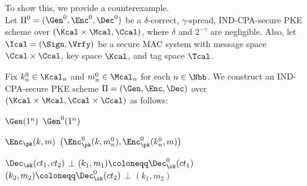 \begin{answer}
    To show this, we provide a counterexample.\\
    Let $\Pi^0=(\Gen^0, \Enc^0, \Dec^0)$ be a $\delta$-correct, $\gamma$-spread, IND-CPA-secure PKE scheme over $(\Kcal\times \Mcal, \Ccal)$, where $\delta$ and $2^{-\gamma}$ are negligible. Also, let  $\Ical=(\Sign, \Vrfy)$ be a secure MAC system with message space $\Ccal \times \Ccal$, key space $\Kcal$, and tag space $\Tcal$.

    Fix $k_n^0\in\Kcal_n$ and $m_n^0\in\Mcal_n$ for each $n\in\Nbb$. We construct an IND-CPA-secure PKE scheme $\Pi=(\Gen, \Enc, \Dec)$ over $(\Kcal\times \Mcal, \Ccal\times \Ccal)$ as follows:
    \begin{simplebox}
        \small
        \noindent
        \begin{minipage}[t]{0.27\textwidth}
            \begin{algorithmic}[1]
                \Statex \textbf{$\Gen(1^n)$}
                \Indent
                \State \Return $\Gen^0(1^n)$
                \EndIndent
            \end{algorithmic}
        \end{minipage}
        \hfill
        \begin{minipage}[t]{0.30\textwidth}
            \begin{algorithmic}[1]
                \Statex \textbf{$\Enc_\pk(k ,m)$}
                \Indent
                    \State \Return $\left(\Enc^0_\pk(k,m_n^0), \Enc^0_\pk(k_n^0 ,m)\right)$
                \EndIndent
            \end{algorithmic}
        \end{minipage}
        \hfill
        \begin{minipage}[t]{0.40\textwidth}
            \begin{algorithmic}[1]
                \Statex \textbf{$\Dec_\sk(ct_1, ct_2)$}
                \Indent
                        \State \Return $\bot$
                    \EndIf
                    \State $(k_1, m_1)\coloneqq \Dec^0_\sk(ct_1)$
                    \State $(k_2, m_2)\coloneqq \Dec^0_\sk(ct_2)$
                        \State \Return $\bot$
                    \EndIf
                    \State \Return $(k_1, m_2)$
                \EndIndent
            \end{algorithmic}
        \end{minipage}

\end{simplebox}
\end{answer}
